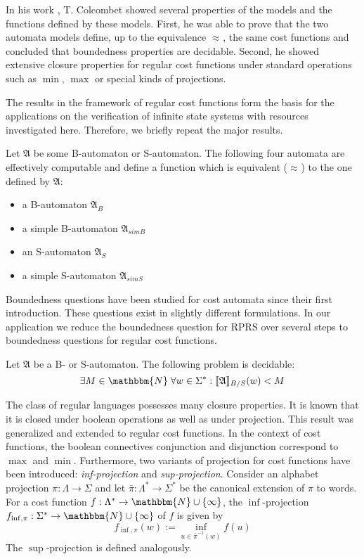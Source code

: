 \documentclass{LMCS}
\newcommand{\nat}{\mathbbm{N}}
\newcommand{\natInf}{\nat \cup \{ \infty \}}
\newcommand{\automatonA}{\mathfrak A}
\newcommand{\semantics}[1]{\llbracket#1\rrbracket}
\newcommand{\costEquiv}[1][\alpha]{\approx_{#1}}
\newcommand{\infProjection}[1]{_{\inf,#1}}
\newcommand{\RPRS}{\textsf{RPRS}}
\begin{document}
In his work \cite{regularcostfunctions}, T. Colcombet showed several properties
of the models and the functions defined by these models. First, he was able to
prove that the two automata models define, up to the equivalence 
$\costEquiv[]$, the same cost functions and concluded that boundedness 
properties are decidable. Second, he showed extensive closure properties for 
regular cost functions under standard operations such as $\min$, $\max$ or 
special kinds of projections. 

The results in the framework of regular cost functions form the basis for the
applications on the verification of infinite state systems with resources
investigated here. Therefore, we briefly repeat the major results.

\begin{thm}\label{thm:EqualExpressivenessOfSandB}
	Let $\automatonA$ be some B-automaton or S-automaton. The following four
    automata are effectively computable and define a function which is
    equivalent ($\costEquiv[]$) to the one defined by $\automatonA$:
	\begin{itemize}
		\item a B-automaton $\automatonA_{B}$
		\item a simple B-automaton $\automatonA_{\mathit{simB}}$
		\item an S-automaton $\automatonA_{S}$
		\item a simple S-automaton $\automatonA_{\mathit{simS}}$
	\end{itemize}
\end{thm}

Boundedness questions have been studied for cost automata since their first
introduction. These questions exist in slightly different formulations. In
our application we reduce the boundedness question for \RPRS{} over several
steps to boundedness questions for regular cost functions.

\begin{thm}\label{thm:BoundednessOfCounterautomataIsDecidable}
 Let $\automatonA$ be a B- or S-automaton. The following problem is decidable:
 $$\exists M \in \nat\; \forall w \in \Sigma^* :
\semantics{\automatonA}_{B/S}(w) < M$$
\end{thm}

The class of regular languages possesses many closure properties. It is
known that it is closed under boolean operations as well as under projection.
This result was generalized and extended to regular cost functions.
In the context of cost functions, the boolean connectives conjunction and
disjunction correspond to $\max$ and $\min$. Furthermore, two variants of
projection for cost functions have been introduced: 
\emph{inf-projection} and \emph{sup-projection}. Consider an alphabet projection
$\pi: \Lambda \to \Sigma$ and let $\bar\pi: \Lambda^* \to \Sigma^*$ be the
canonical extension of $\pi$ to words. For a cost function 
$f: \Lambda^* \to \natInf$, the $\inf$-projection 
$f\infProjection{\pi}: \Sigma^* \to \natInf$ of $f$ is given by  
\[ f\infProjection{\pi}(w) := \inf_{u \in \bar\pi^{-1}(w)} f(u) \]
The $\sup$-projection is defined analogously. 
\end{document}
